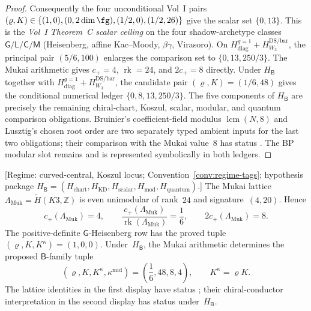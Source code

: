 \begin{proof}
Consequently the four unconditional Vol~I pairs
$(\varrho,K)\in\{(1,0),(0,2\dim\fg),(1/2,0),(1/2,26)\}$
give the scalar set $\{0,13\}$.  This is the
\emph{Vol~I Theorem~C scalar ceiling} on the four shadow-archetype
classes $\mathsf{G}/\mathsf{L}/\mathsf{C}/\mathsf{M}$
\textup{(}Heisenberg, affine Kac--Moody, $\beta\gamma$, Virasoro\textup{)}.
On $H_{\mathrm{diag}}^{g=1}+H_{W_3}^{\mathrm{DS/bar}}$, the principal
pair $(5/6,100)$ enlarges the comparison set to
$\{0,13,250/3\}$.  The Mukai arithmetic gives
$c_+=4$, $\operatorname{rk}=24$, and $2c_+=8$ directly.  Under
$H_{\mathsf B}$ together with
$H_{\mathrm{diag}}^{g=1}+H_{W_3}^{\mathrm{DS/bar}}$, the candidate
pair $(\varrho,K)=(1/6,48)$ gives the conditional numerical ledger
$\{0,8,13,250/3\}$.  The five components of
$H_{\mathsf B}$ are precisely the remaining chiral-chart, Koszul,
scalar, modular, and quantum comparison obligations.  Bruinier's
coefficient-field modulus $\operatorname{lcm}(N,8)$ and Lusztig's
chosen root order are two separately typed ambient inputs for the last
two obligations; their comparison with the Mukai value~$8$ has status
\ClaimStatusConjectured.  The BP modular slot remains
\ClaimStatusOpen and is represented symbolically in both ledgers.
\end{proof}

\begin{proposition}
\label{prop:G-B-heisenberg-rho-bifurcation}
\textup{[Regime: curved-central, Koszul locus;
Convention~\textup{\ref{conv:regime-tags}};
hypothesis package $H_{\mathsf B}=(H_{\mathrm{chart}},H_{\mathrm{KD}},
H_{\mathrm{scalar}},H_{\mathrm{mod}},H_{\mathrm{quantum}})$.]}
The Mukai lattice
$\Lambda_{\mathrm{Muk}}=\widetilde H(K3,\mathbb Z)$ is even unimodular
of rank~$24$ and signature~$(4,20)$.  Hence
\[
 c_+(\Lambda_{\mathrm{Muk}})=4,
 \qquad
 \frac{c_+(\Lambda_{\mathrm{Muk}})}{\operatorname{rk}(\Lambda_{\mathrm{Muk}})}
 =\frac16,
 \qquad
 2c_+(\Lambda_{\mathrm{Muk}})=8.
\]
The positive-definite $\mathsf G$-Heisenberg row has the proved tuple
$(\varrho,K,K^\kappa)=(1,0,0)$.  Under~$H_{\mathsf B}$, the Mukai
arithmetic determines the proposed $\mathsf B$-family tuple
\[
 (\varrho,K,K^\kappa,\kappa^{\mathrm{mid}})
 =\left(\frac16,48,8,4\right),
 \qquad K^\kappa=\varrho K.
\]
The lattice identities in the first display have status
\ClaimStatusProvedHere; their chiral-conductor interpretation in the
second display has status \ClaimStatusConjectured under~$H_{\mathsf B}$.
\end{proposition}

